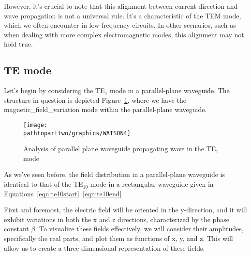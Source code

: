 However, it's crucial to note that this alignment between current direction and wave propagation is not a universal rule. It's a characteristic of the TEM mode, which we often encounter in low-frequency circuits. In other scenarios, such as when dealing with more complex electromagnetic modes, this alignment may not hold true.

\subsection{TE mode}
Let's begin by considering the TE$_1$ mode in a parallel-plane waveguide. The structure in question is depicted Figure~\ref{fig:watson4}, where we have the magnetic_field_variation mode within the parallel-plane waveguide.
\begin{figure}[h]
\centering
\texttt{[image: \\pathtoparttwo/graphics/WATSON4]}
\caption{Analysis of parallel plane waveguide propagating wave in the TE$_1$ mode}
\label{fig:watson4}
\end{figure}

As we've seen before, the field distribution in a parallel-plane waveguide is identical to that of the TE$_{10}$ mode in a rectangular waveguide given in Equations~\eqref{eqn:te10start}\textemdash~\eqref{eqn:te10end}

First and foremost, the electric field will be oriented in the y-direction, and it will exhibit variations in both the x and z directions, characterized by the phase constant \(\beta\). To visualize these fields effectively, we will consider their amplitudes, specifically the real parts, and plot them as functions of x, y, and z. This will allow us to create a three-dimensional representation of these fields.

